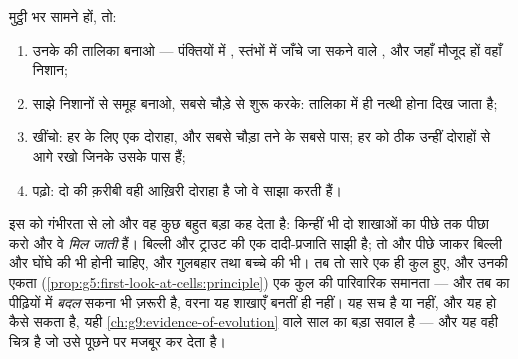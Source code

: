 \begin{method}[छोटा नातेदारी-वृक्ष बनाना]\label{met:g6:classification-kinship:build}
मुट्ठी भर  सामने हों, तो:
\begin{enumerate}
  \item उनके  की तालिका बनाओ --- पंक्तियों में ,
        स्तंभों में जाँचे जा सकने वाले , और जहाँ मौजूद हों वहाँ
        निशान;
  \item साझे निशानों से समूह बनाओ, सबसे चौड़े  से शुरू करके:
        तालिका में ही नत्थी होना दिख जाता है;
  \item {} खींचो: हर  के लिए एक दोराहा, और सबसे चौड़ा तने के
        सबसे पास; हर  को ठीक उन्हीं दोराहों से आगे रखो जिनके
         उसके पास हैं;
  \item {} पढ़ो: दो  की क़रीबी वही आख़िरी दोराहा है जो
        वे साझा करती हैं।
\end{enumerate}
\end{method}

\begin{remark}[वृक्ष चुपचाप क्या कह देता है]\label{rem:g6:classification-kinship:implies}
इस  को गंभीरता से लो और वह कुछ बहुत बड़ा कह देता है: किन्हीं भी दो
शाखाओं का पीछे तक पीछा करो और वे \emph{मिल जाती} हैं। बिल्ली और ट्राउट
की एक दादी-प्रजाति साझी है; तो और पीछे जाकर बिल्ली और घोंघे की भी होनी
चाहिए, और गुलबहार तथा बच्चे की भी। तब तो सारे  एक ही कुल हुए, और
उनकी एकता (\cref{prop:g5:first-look-at-cells:principle}) एक कुल की
पारिवारिक समानता --- और तब  का पीढ़ियों में \emph{बदल} सकना
भी ज़रूरी है, वरना यह शाखाएँ बनतीं ही नहीं। यह सच है या नहीं, और यह हो
कैसे सकता है, यही \cref{ch:g9:evidence-of-evolution} वाले साल का बड़ा
सवाल है --- और यह  वही चित्र है जो उसे पूछने पर मजबूर कर देता है।
\end{remark}

